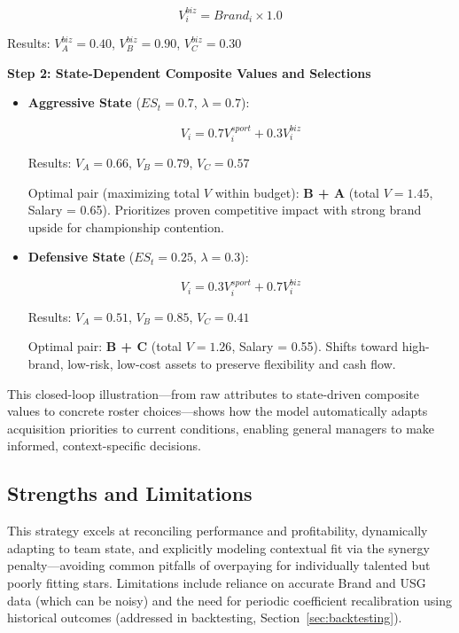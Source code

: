 \documentclass{mcmthesis}
\begin{document}
\[
V^{biz}_i = Brand_i \times 1.0
\]

Results: $V^{biz}_A = 0.40$, $V^{biz}_B = 0.90$, $V^{biz}_C = 0.30$

\textbf{Step 2: State-Dependent Composite Values and Selections}

\begin{itemize}
    \item \textbf{Aggressive State} ($ES_t = 0.7$, $\lambda = 0.7$):
    
    \[
    V_i = 0.7 V^{sport}_i + 0.3 V^{biz}_i
    \]
    
    Results: $V_A = 0.66$, $V_B = 0.79$, $V_C = 0.57$
    
    Optimal pair (maximizing total $V$ within budget): \textbf{B + A} (total $V = 1.45$, Salary = 0.65). Prioritizes proven competitive impact with strong brand upside for championship contention.
    
    \item \textbf{Defensive State} ($ES_t = 0.25$, $\lambda = 0.3$):
    
    \[
    V_i = 0.3 V^{sport}_i + 0.7 V^{biz}_i
    \]
    
    Results: $V_A = 0.51$, $V_B = 0.85$, $V_C = 0.41$
    
    Optimal pair: \textbf{B + C} (total $V = 1.26$, Salary = 0.55). Shifts toward high-brand, low-risk, low-cost assets to preserve flexibility and cash flow.
\end{itemize}

This closed-loop illustration—from raw attributes to state-driven composite values to concrete roster choices—shows how the model automatically adapts acquisition priorities to current conditions, enabling general managers to make informed, context-specific decisions.




\subsection{Strengths and Limitations}
This strategy excels at reconciling performance and profitability, dynamically adapting to team state, and explicitly modeling contextual fit via the synergy penalty—avoiding common pitfalls of overpaying for individually talented but poorly fitting stars. Limitations include reliance on accurate Brand and USG data (which can be noisy) and the need for periodic coefficient recalibration using historical outcomes (addressed in backtesting, Section~\ref{sec:backtesting}).
\end{document}
